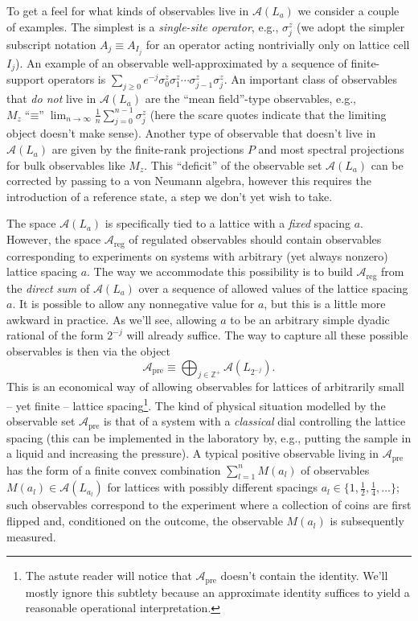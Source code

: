 \documentclass[11pt]{amsart}
\theoremstyle{plain}%
\theoremstyle{definition}
\theoremstyle{remark}
\begin{document}
To get a feel for what kinds of observables live in $\mathcal{A}(L_a)$ we consider a couple of examples. The simplest is a \emph{single-site operator}, e.g., $\sigma^z_j$ (we adopt the simpler subscript notation $A_j \equiv A_{I_j}$ for an operator acting nontrivially only on lattice cell $I_j$). An example of an observable well-approximated by a sequence of finite-support operators is $\sum_{j\ge 0} e^{-j}\sigma^z_0 \sigma_1^z  \cdots \sigma_{j-1}^z\sigma_j^z$. An important class of observables that \emph{do not} live in $\mathcal{A}(L_a)$ are the ``mean field''-type observables, e.g., $M_z \text{``$\equiv$''} \lim_{n\rightarrow\infty}\frac{1}{n}\sum_{j = 0}^{n-1} \sigma^z_j$ (here the scare quotes indicate that the limiting object doesn't make sense). Another type of observable that doesn't live in $\mathcal{A}(L_a)$ are given by the finite-rank projections $P$ and most spectral projections for bulk observables like $M_z$. This ``deficit'' of the observable set $\mathcal{A}(L_a)$ can be corrected by passing to a von Neumann algebra, however this requires the introduction of a reference state, a step we don't yet wish to take. 

The space $\mathcal{A}(L_a)$ is specifically tied to a lattice with a \emph{fixed} spacing $a$. However, the space $\mathcal{A}_{\text{reg}}$ of regulated observables should contain observables corresponding to experiments on systems with arbitrary (yet always nonzero) lattice spacing $a$. The way we accommodate this possibility is to build $\mathcal{A}_{\text{reg}}$ from the \emph{direct sum} of $\mathcal{A}(L_a)$ over a sequence of allowed values of the lattice spacing $a$. It is possible to allow any nonnegative value for $a$, but this is a little more awkward in practice. As we'll see, allowing $a$ to be an arbitrary simple dyadic rational of the form $2^{-j}$ will already suffice. The way to capture all these possible observables is then via the object 
\begin{equation*}
	\mathcal{A}_{\text{pre}} \equiv \bigoplus_{j \in \mathbb{Z}^+} \mathcal{A}(L_{2^{-j}}).
\end{equation*}
This is an economical way of allowing observables for lattices of arbitrarily small -- yet finite -- lattice spacing\footnote{The astute reader will notice that $\mathcal{A}_{\text{pre}}$ doesn't contain the identity. We'll mostly ignore this subtlety because an approximate identity suffices to yield a reasonable operational interpretation.}. The kind of physical situation modelled by the observable set $\mathcal{A}_{\text{pre}}$ is that of a system with a \emph{classical} dial controlling the lattice spacing (this can be implemented in the laboratory by, e.g., putting the sample in a liquid and increasing the pressure). A typical positive observable living in $\mathcal{A}_{\text{pre}}$ has the form of a finite convex combination $\sum_{l=1}^n M(a_l)$ of observables $M(a_l)\in\mathcal{A}(L_{a_l})$ for lattices with possibly different spacings $a_l\in\{1, \frac{1}{2}, \frac{1}{4}, \ldots\}$; such observables correspond to the experiment where a collection of coins are first flipped and, conditioned on the outcome, the observable $M(a_l)$ is subsequently measured. 
\end{document}
